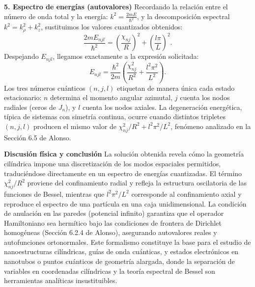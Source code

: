 \documentclass[a4paper]{article}
\begin{document}
\textbf{5. Espectro de energías (autovalores)}
Recordando la relación entre el número de onda total y la energía: $k^2 = \frac{2mE}{\hbar^2}$, y la descomposición espectral $k^2 = k_\rho^2 + k_z^2$, sustituimos los valores cuantizados obtenidos:
$$\frac{2mE_{njl}}{\hbar^2} = \left(\frac{\chi_{nj}}{R}\right)^2 + \left(\frac{l\pi}{L}\right)^2.$$
Despejando $E_{njl}$, llegamos exactamente a la expresión solicitada:
$$E_{njl} = \frac{\hbar^2}{2m}\left(\frac{\chi_{nj}^2}{R^2} + \frac{l^2\pi^2}{L^2}\right).$$
Los tres números cuánticos $(n,j,l)$ etiquetan de manera única cada estado estacionario: $n$ determina el momento angular azimutal, $j$ cuenta los nodos radiales (ceros de $J_n$), y $l$ cuenta los nodos axiales. La degeneración energética, típica de sistemas con simetría continua, ocurre cuando distintos tripletes $(n,j,l)$ producen el mismo valor de $\chi_{nj}^2/R^2 + l^2\pi^2/L^2$, fenómeno analizado en la Sección 6.5 de Alonso.

\textbf{Discusión física y conclusión}
La solución obtenida revela cómo la geometría cilíndrica impone una discretización de los modos espaciales permitidos, traduciéndose directamente en un espectro de energías cuantizadas. El término $\chi_{nj}^2/R^2$ proviene del confinamiento radial y refleja la estructura oscilatoria de las funciones de Bessel, mientras que $l^2\pi^2/L^2$ corresponde al confinamiento axial y reproduce el espectro de una partícula en una caja unidimensional. La condición de anulación en las paredes (potencial infinito) garantiza que el operador Hamiltoniano sea hermítico bajo las condiciones de frontera de Dirichlet homogéneas (Sección 6.2.4 de Alonso), asegurando autovalores reales y autofunciones ortonormales. Este formalismo constituye la base para el estudio de nanoestructuras cilíndricas, guías de onda cuánticas, y estados electrónicos en nanotubos o puntos cuánticos de geometría alargada, donde la separación de variables en coordenadas cilíndricas y la teoría espectral de Bessel son herramientas analíticas insustituibles.



 
\end{document}
